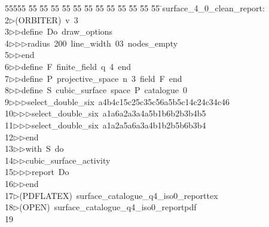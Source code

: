 %
%
\begin{tabbing}
55555 \= 55 \= 55 \= 55 \= 55 \= 55 \= 55 \= 55 \= 55 \= 55 \= 55 \= 55 \= 55 \= \>surface\_4\_0\_clean\_report:\\[0pt]
2\>$\triangleright$\>(ORBITER)\ v\ 3\ \\[0pt]
3\>$\triangleright$\>$\triangleright$\>define\ Do\ draw\_options\ \\[0pt]
4\>$\triangleright$\>$\triangleright$\>$\triangleright$\>radius\ 200\ line\_width\ 03\ nodes\_empty\ \\[0pt]
5\>$\triangleright$\>$\triangleright$\>end\ \\[0pt]
6\>$\triangleright$\>$\triangleright$\>define\ F\ finite\_field\ q\ 4\ end\ \\[0pt]
7\>$\triangleright$\>$\triangleright$\>define\ P\ projective\_space\ n\ 3\ field\ F\ end\ \\[0pt]
8\>$\triangleright$\>$\triangleright$\>define\ S\ cubic\_surface\ space\ P\ catalogue\ 0\ \\[0pt]
9\>$\triangleright$\>$\triangleright$\>$\triangleright$\>select\_double\_six\ a4b4c15c25c35c56a5b5c14c24c34c46\ \\[0pt]
10\>$\triangleright$\>$\triangleright$\>$\triangleright$\>select\_double\_six\ a1a6a2a3a4a5b1b6b2b3b4b5\ \\[0pt]
11\>$\triangleright$\>$\triangleright$\>$\triangleright$\>select\_double\_six\ a1a2a5a6a3a4b1b2b5b6b3b4\ \\[0pt]
12\>$\triangleright$\>$\triangleright$\>end\ \\[0pt]
13\>$\triangleright$\>$\triangleright$\>with\ S\ do\ \\[0pt]
14\>$\triangleright$\>$\triangleright$\>cubic\_surface\_activity\ \\[0pt]
15\>$\triangleright$\>$\triangleright$\>$\triangleright$\>report\ Do\ \\[0pt]
16\>$\triangleright$\>$\triangleright$\>end\\[0pt]
17\>$\triangleright$\>(PDFLATEX)\ surface\_catalogue\_q4\_iso0\_reporttex\\[0pt]
18\>$\triangleright$\>(OPEN)\ surface\_catalogue\_q4\_iso0\_reportpdf\\[0pt]
19\>\end{tabbing}
